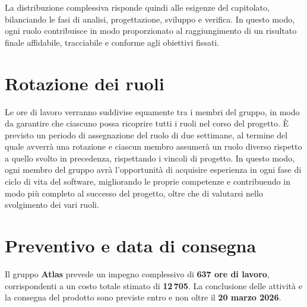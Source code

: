 \documentclass[a4paper,12pt]{article}
\begin{document}
La distribuzione complessiva risponde quindi alle esigenze del capitolato, bilanciando le fasi di analisi, progettazione, sviluppo e verifica.  
In questo modo, ogni ruolo contribuisce in modo proporzionato al raggiungimento di un risultato finale affidabile, tracciabile e conforme agli obiettivi fissati.


\section{Rotazione dei ruoli}
    Le ore di lavoro verranno suddivise equamente tra i membri del gruppo, in modo da garantire che ciascuno possa ricoprire tutti i ruoli nel corso del progetto. È previsto un periodo di assegnazione del ruolo di due settimane, al termine del quale avverrà una rotazione e ciascun membro assumerà un ruolo diverso rispetto a quello svolto in precedenza, rispettando i vincoli di progetto. In questo modo, ogni membro del gruppo avrà l'opportunità di acquisire esperienza in ogni fase di ciclo di vita del software, migliorando le proprie competenze e contribuendo in modo più completo al successo del progetto, oltre che di valutarsi nello svolgimento dei vari ruoli.



\section{Preventivo e data di consegna}
Il gruppo \textbf{Atlas} prevede un impegno complessivo di \textbf{637 ore di lavoro}, corrispondenti a un costo totale stimato di \textbf{12\,705}\texteuro.  
La conclusione delle attività e la consegna del prodotto sono previste entro e non oltre il \textbf{20 marzo 2026}.
 
\end{document}
